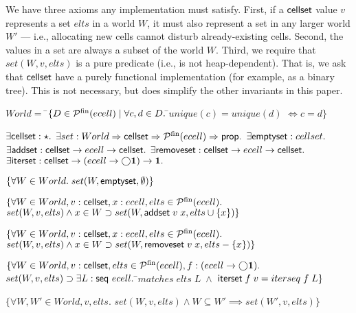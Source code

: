 \documentclass[natbib]{sigplanconf}
\begin{document}
We have three axioms any implementation must satisfy. First, if a
$\mbox{\textsf{{cellset}}}$ value $v$ represents a set $elts$ in a world $W$, it must
also represent a set in any larger world $W'$ --- i.e., allocating
new cells cannot disturb already-existing cells.  Second, the values
in a set are always a subset of the world $W$.  Third, we require
that $set(W,v,elts)$ is a pure predicate (i.e., is not
heap-dependent). That is, we ask that $\mbox{\textsf{{cellset}}}$ have a purely
functional implementation (for example, as a binary tree). This is not
necessary, but does simplify the other invariants in this paper.

{\small
\begin{specification}
\nextline
$World = $ \nextline
\;\;\;\;\=$\{D \in \mathcal{P}^{\mathrm{fin}}({ecell})\;|\;\forall c,d \in D.\;$\=$unique(c) = unique(d)$\nextline
        \>                                                      \>$\iff c = d\}$\nextline[0.5em]

$\exists \mbox{\textsf{{cellset}}} : \star.$ \nextline
$\exists set : World \Rightarrow \mbox{\textsf{{cellset}}} \Rightarrow \mathcal{P}^{\mathrm{fin}}({ecell}) \Rightarrow \mbox{\textsf{{prop}}}.$ \nextline
$\exists \mbox{\textsf{{emptyset}}}    : cellset.$ \nextline
$\exists \mbox{\textsf{{addset}}}      : \mbox{\textsf{{cellset}}} \to ecell \to \mbox{\textsf{{cellset}}}.$ \nextline
$\exists \mbox{\textsf{{removeset}}}   : \mbox{\textsf{{cellset}}} \to ecell \to \mbox{\textsf{{cellset}}}.$ \nextline
$\exists \mbox{\textsf{{iterset}}}     : \mbox{\textsf{{cellset}}} \to (ecell \to \bigcirc{\mathbf{1}}) \to \mathbf{1}.$\nextline[0.5em]

$\{{\forall W \in World.\; set(W, \mbox{\textsf{{emptyset}}}, \emptyset)}\}$ 

\specand \nextline[0.5em]

$\{\forall W \in World, v : \mbox{\textsf{{cellset}}}, x : ecell, elts \in \mathcal{P}^{\mathrm{fin}}({ecell}).$ \nextline 
\> $set(W, v, elts) \land x \in W \supset set(W, \mbox{\textsf{{addset}}}\;v\;x, elts \cup \{{x}\})\}$ \specand \nextline[0.5em]


$\{\forall W \in World, v : \mbox{\textsf{{cellset}}}, x : ecell, elts \in \mathcal{P}^{\mathrm{fin}}({ecell}).$ \nextline 
\> $set(W, v, elts) \land x \in W \supset set(W, \mbox{\textsf{{removeset}}}\;v\;x, elts - \{{x}\})\}$ \specand \nextline[0.5em]


$\{\forall W \in World, v : \mbox{\textsf{{cellset}}}, elts \in \mathcal{P}^{\mathrm{fin}}({ecell}), 
         f : (ecell \to \bigcirc{\mathbf{1}}).$ \nextline 
\> $set(W, v, elts) \supset \exists L : \mbox{\textsf{{seq }}}{ecell}.\;$\=$matches\;elts\;L\; \land$ \nextline
\>                                \>$\mbox{\textsf{{iterset}}}\;f\;v = iterseq\;f\;L\}$ \specand \nextline[0.5em]


$\{\forall W, W' \in World, v, elts.$ \nextline
\>$set(W,v,elts) \land W \subseteq W' \implies set(W',v, elts)\}$\specand \nextline[0.5em]


\end{specification}}
\end{document}
